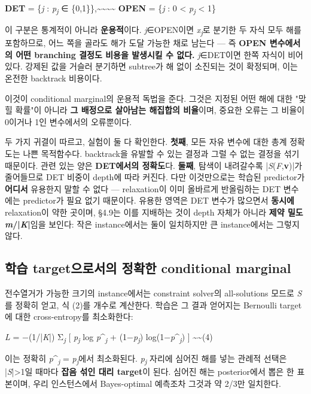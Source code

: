\documentclass[final,5p,twocolumn]{elsarticle}
\begin{document}
\begin{center}\small \textbf{DET} = \{\textit{j} : \textit{p\textsubscript{j}} ∈ \{0,1\}\},\textasciitilde{}\textasciitilde{}\textasciitilde{}\textasciitilde{} \textbf{OPEN} = \{\textit{j} : 0 < \textit{p\textsubscript{j}} < 1\}\end{center}
이 구분은 통계적이 아니라 \textbf{운용적}이다. \textit{j}∈OPEN이면 \textit{x\textsubscript{j}}로 분기한 두 자식 모두 해를 포함하므로, 어느 쪽을 골라도 해가 도달 가능한 채로 남는다 — 즉 \textbf{OPEN 변수에서의 어떤 branching 결정도 비용을 발생시킬 수 없다.} \textit{j}∈DET이면 한쪽 자식이 비어 있다. 강제된 값을 거슬러 분기하면 subtree가 해 없이 소진되는 것이 확정되며, 이는 온전한 backtrack 비용이다.

이것이 conditional marginal의 운용적 독법을 준다. 그것은 지정된 어떤 해에 대한 "맞힐 확률"이 아니라 \textbf{그 배정으로 살아남는 해집합의 비율}이며, 중요한 오류는 그 비율이 0이거나 1인 변수에서의 오류뿐이다.

두 가지 귀결이 따르고, 실험이 둘 다 확인한다. \textbf{첫째}, 모든 자유 변수에 대한 총계 정확도는 나쁜 목적함수다. backtrack을 유발할 수 있는 결정과 그럴 수 없는 결정을 섞기 때문이다. 관련 있는 양은 \textbf{DET에서의 정확도}다. \textbf{둘째}, 탐색이 내려갈수록 |\textit{S}(\textit{F},\textbf{v})|가 줄어들므로 DET 비중이 depth에 따라 커진다. 다만 이것만으로는 학습된 predictor가 \textbf{어디서} 유용한지 말할 수 없다 — relaxation이 이미 올바르게 반올림하는 DET 변수에는 predictor가 필요 없기 때문이다. 유용한 영역은 DET 변수가 많으면서 \textbf{동시에} relaxation이 약한 곳이며, §4.9는 이를 지배하는 것이 depth 자체가 아니라 \textbf{제약 밀도 \textit{m}/|\textit{K}|}임을 보인다: 작은 instance에서는 둘이 일치하지만 큰 instance에서는 그렇지 않다.

\subsection{학습 target으로서의 정확한 conditional marginal}
전수열거가 가능한 크기의 instance에서는 constraint solver의 all-solutions 모드로 \textit{S}를 정확히 얻고, 식 (2)를 개수로 계산한다. 학습은 그 결과 얻어지는 Bernoulli target에 대한 cross-entropy를 최소화한다:

\begin{center}\small \textit{L} = −(1/|\textit{K}|) Σ\textsubscript{\textit{j}} [ \textit{p\textsubscript{j}} log \textit{p}\^{}\textsubscript{\textit{j}} + (1−\textit{p\textsubscript{j}}) log(1−\textit{p}\^{}\textsubscript{\textit{j}}) ]  \textasciitilde{}\textasciitilde{}(4)\end{center}
이는 정확히 \textit{p}\^{}\textsubscript{\textit{j}} = \textit{p\textsubscript{j}}에서 최소화된다. \textit{p\textsubscript{j}} 자리에 심어진 해를 넣는 관례적 선택은 |\textit{S}|>1일 때마다 \textbf{잡음 섞인 대리 target}이 된다. 심어진 해는 posterior에서 뽑은 한 표본이며, 우리 인스턴스에서 Bayes-optimal 예측조차 그것과 약 2/3만 일치한다.
\end{document}
